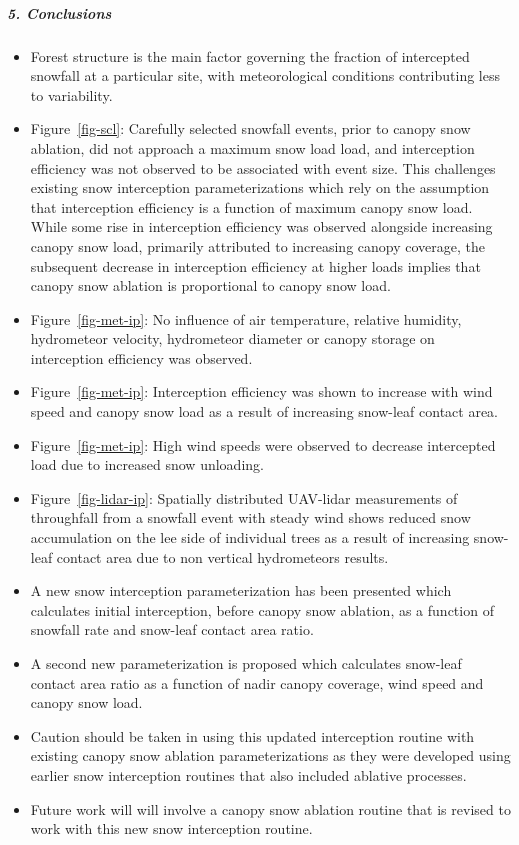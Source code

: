 \documentclass[
  letterpaper,
  DIV=11,
  numbers=noendperiod]{scrartcl}
\let\oldsubparagraph\subparagraph
\renewcommand{\subparagraph}[1]{\oldsubparagraph{#1}\mbox{}}
\begin{document}
\subparagraph{5. Conclusions}\label{conclusions}

\begin{itemize}
\item
  Forest structure is the main factor governing the fraction of
  intercepted snowfall at a particular site, with meteorological
  conditions contributing less to variability.
\item
  Figure~\ref{fig-scl}: Carefully selected snowfall events, prior to
  canopy snow ablation, did not approach a maximum snow load load, and
  interception efficiency was not observed to be associated with event
  size. This challenges existing snow interception parameterizations
  which rely on the assumption that interception efficiency is a
  function of maximum canopy snow load. While some rise in interception
  efficiency was observed alongside increasing canopy snow load,
  primarily attributed to increasing canopy coverage, the subsequent
  decrease in interception efficiency at higher loads implies that
  canopy snow ablation is proportional to canopy snow load.
\item
  Figure~\ref{fig-met-ip}: No influence of air temperature, relative
  humidity, hydrometeor velocity, hydrometeor diameter or canopy storage
  on interception efficiency was observed.
\item
  Figure~\ref{fig-met-ip}: Interception efficiency was shown to increase
  with wind speed and canopy snow load as a result of increasing
  snow-leaf contact area.
\item
  Figure~\ref{fig-met-ip}: High wind speeds were observed to decrease
  intercepted load due to increased snow unloading.
\item
  Figure~\ref{fig-lidar-ip}: Spatially distributed UAV-lidar
  measurements of throughfall from a snowfall event with steady wind
  shows reduced snow accumulation on the lee side of individual trees as
  a result of increasing snow-leaf contact area due to non vertical
  hydrometeors results.
\item
  A new snow interception parameterization has been presented which
  calculates initial interception, before canopy snow ablation, as a
  function of snowfall rate and snow-leaf contact area ratio.
\item
  A second new parameterization is proposed which calculates snow-leaf
  contact area ratio as a function of nadir canopy coverage, wind speed
  and canopy snow load.
\item
  Caution should be taken in using this updated interception routine
  with existing canopy snow ablation parameterizations as they were
  developed using earlier snow interception routines that also included
  ablative processes.
\item
  Future work will will involve a canopy snow ablation routine that is
  revised to work with this new snow interception routine.
\end{itemize}
\end{document}
